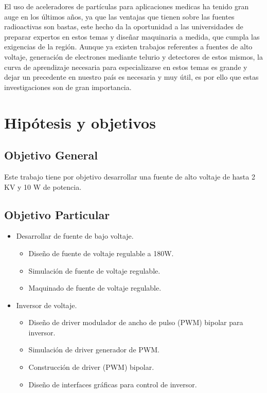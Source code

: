 El uso de aceleradores de partículas para aplicaciones medicas ha tenido gran auge en los últimos años, ya que las ventajas que tienen sobre las fuentes radioactivas son bastas, este hecho da la oportunidad a las universidades de preparar expertos en estos temas y diseñar maquinaria a medida, que cumpla las exigencias de la región. Aunque ya existen trabajos referentes a fuentes de alto voltaje, generación de electrones mediante telurio y detectores de estos mismos, la curva de aprendizaje necesaria para especializarse en estos temas es grande y dejar un precedente en nuestro país es necesaria y muy útil, es por ello que estas
investigaciones son de gran importancia.
\newpage
\section{Hipótesis y objetivos}

\subsection{Objetivo General}

Este trabajo tiene por objetivo desarrollar una fuente de alto voltaje de hasta 2 KV y 10 W de potencia.

\subsection{Objetivo Particular}


\begin{itemize}
\item Desarrollar de fuente de bajo voltaje.
\begin{itemize}
\item Diseño de fuente de voltaje regulable a 180W.
\item Simulación de fuente de voltaje regulable.
\item Maquinado de fuente de voltaje regulable.
\end{itemize}
\end{itemize}


\begin{itemize}
\item Inversor de voltaje.
\begin{itemize}  
\item Diseño de driver modulador de ancho de pulso (PWM) bipolar para inversor.
\item Simulación de driver generador de PWM.
\item Construcción de driver (PWM) bipolar.
\item Diseño de interfaces gráficas para control de inversor.
\end{itemize} 
\end{itemize}  

